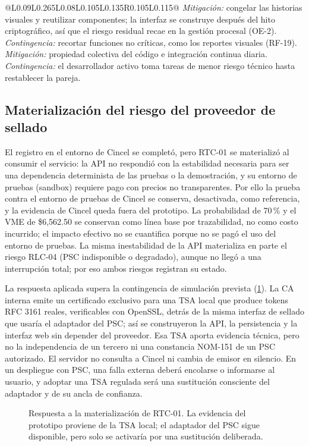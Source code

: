{\begin{longtable}{@{}L{0.09\linewidth}L{0.265\linewidth}L{0.08\linewidth}L{0.105\linewidth}L{0.135\linewidth}R{0.105\linewidth}L{0.115\linewidth}@{}}
    {\textit{Mitigación:} congelar las historias visuales y reutilizar componentes; la interfaz se construye después del hito criptográfico, así que el riesgo residual recae en la gestión procesal (OE-2). \textit{Contingencia:} recortar funciones no críticas, como los reportes visuales (RF-19).}
    {\textit{Mitigación:} propiedad colectiva del código e integración continua diaria. \textit{Contingencia:} el desarrollador activo toma tareas de menor riesgo técnico hasta restablecer la pareja.}
\end{longtable}}

\subsection{Materialización del riesgo del proveedor de sellado}\label{sec:riesgo-psc-materializado}

El registro en el entorno de Cincel se completó, pero RTC-01 se materializó al consumir el servicio: la API no respondió con la estabilidad necesaria para ser una dependencia determinista de las pruebas o la demostración, y su entorno de pruebas (sandbox) requiere pago con precios no transparentes. Por ello la prueba contra el entorno de pruebas de Cincel se conserva, desactivada, como referencia, y la evidencia de Cincel queda fuera del prototipo. La probabilidad de 70\,\% y el VME de \$6,562.50 se conservan como línea base por trazabilidad, no como costo incurrido; el impacto efectivo no se cuantifica porque no se pagó el uso del entorno de pruebas. La misma inestabilidad de la API materializa en parte el riesgo RLC-04 (PSC indisponible o degradado), aunque no llegó a una interrupción total; por eso ambos riesgos registran su estado.

La respuesta aplicada supera la contingencia de simulación prevista (\cref{fig:sellado-psc}). La CA interna emite un certificado exclusivo para una TSA local que produce tokens RFC 3161 reales, verificables con OpenSSL, detrás de la misma interfaz de sellado que usaría el adaptador del PSC; así se construyeron la API, la persistencia y la interfaz web sin depender del proveedor. Esa TSA aporta evidencia técnica, pero no la independencia de un tercero ni una constancia NOM-151 de un PSC autorizado. El servidor no consulta a Cincel ni cambia de emisor en silencio. En un despliegue con PSC, una falla externa deberá encolarse o informarse al usuario, y adoptar una TSA regulada será una sustitución consciente del adaptador y de su ancla de confianza.

\begin{figure}[htbp]
  \centering
  
  \caption{Respuesta a la materialización de RTC-01. La evidencia del prototipo proviene de la TSA local; el adaptador del PSC sigue disponible, pero solo se activaría por una sustitución deliberada.}
  \label{fig:sellado-psc}
\end{figure}
